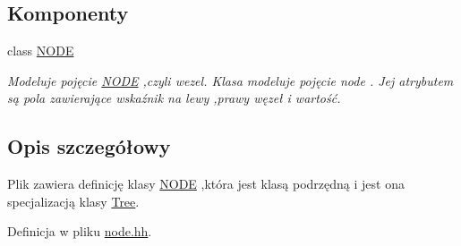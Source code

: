 \subsection*{Komponenty}
\begin{DoxyCompactItemize}
\item 
class \hyperlink{class_n_o_d_e}{N\-O\-D\-E}
\begin{DoxyCompactList}\small\item\em Modeluje pojęcie \hyperlink{class_n_o_d_e}{N\-O\-D\-E} ,czyli wezel. Klasa modeluje pojęcie node . Jej atrybutem są pola zawierające wskaźnik na lewy ,prawy węzeł i wartość. \end{DoxyCompactList}\end{DoxyCompactItemize}


\subsection{Opis szczegółowy}
Plik zawiera definicję klasy \hyperlink{class_n_o_d_e}{N\-O\-D\-E} ,która jest klasą podrzędną i jest ona specjalizacją klasy \hyperlink{class_tree}{Tree}. 

Definicja w pliku \hyperlink{node_8hh_source}{node.\-hh}.

